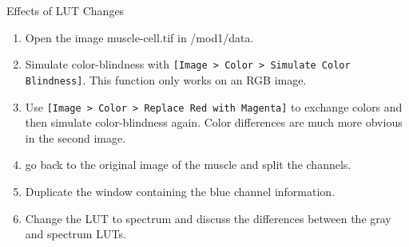 \newpage
\begin{taskbox}{Effects of LUT Changes}

\begin{enumerate}
	\item Open the image muscle-cell.tif in /mod1/data. 
	\item Simulate color-blindness with \texttt{[Image > Color > Simulate Color Blindness]}. This function only works on an RGB image. 
	\item Use \texttt{[Image > Color > Replace Red with Magenta]} to exchange colors and then simulate color-blindness again. Color differences are much more obvious in the second image.
	\item go back to the original image of the muscle and split the channels.
	\item Duplicate the window containing the blue channel information.
	\item Change the LUT to spectrum and discuss the differences between the gray and spectrum LUTs.
\end{enumerate}

\end{taskbox}


